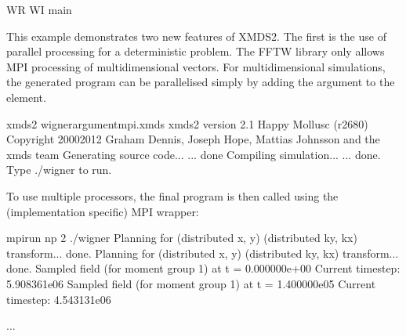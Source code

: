 \documentclass[letterpaper,10pt,english]{sphinxmanual}
\begin{document}
\begin{sphinxVerbatim}[commandchars=\\\{\}]
      
      WR WI
      main
      \PYG{c+cp}{\PYGZlt{}![CDATA[}
      \PYG{c+cp}{]]\PYGZgt{}}
\end{sphinxVerbatim}

\ignorespaces 
{}\ignorespaces 
\sphinxAtStartPar
This example demonstrates two new features of XMDS2.  The first is the use of parallel processing for a deterministic problem.  The FFTW library only allows MPI processing of multidimensional vectors.  For multidimensional simulations, the generated program can be parallelised simply by adding the  argument to the  element.

\begin{sphinxVerbatim}[commandchars=\\\{\}]
\PYGZdl{} xmds2 wigner\PYGZus{}argument\PYGZus{}mpi.xmds
xmds2 version 2.1 \PYGZdq{}Happy Mollusc\PYGZdq{} (r2680)
Copyright 2000\PYGZhy{}2012 Graham Dennis, Joseph Hope, Mattias Johnsson
                    and the xmds team
Generating source code...
... done
Compiling simulation...
... done. Type \PYGZsq{}./wigner\PYGZsq{} to run.
\end{sphinxVerbatim}

\sphinxAtStartPar
To use multiple processors, the final program is then called using the (implementation specific) MPI wrapper:

\begin{sphinxVerbatim}[commandchars=\\\{\}]
\PYGZdl{} mpirun \PYGZhy{}np 2 ./wigner
Planning for (distributed x, y)  (distributed ky, kx) transform... done.
Planning for (distributed x, y)  (distributed ky, kx) transform... done.
Sampled field (for moment group \PYGZsh{}1) at t = 0.000000e+00
Current timestep: 5.908361e\PYGZhy{}06
Sampled field (for moment group \PYGZsh{}1) at t = 1.400000e\PYGZhy{}05
Current timestep: 4.543131e\PYGZhy{}06

...
\end{sphinxVerbatim}
\end{document}
